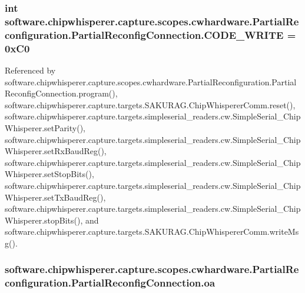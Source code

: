 \subsubsection[{C\+O\+D\+E\+\_\+\+W\+R\+I\+T\+E}]{\setlength{\rightskip}{0pt plus 5cm}int software.\+chipwhisperer.\+capture.\+scopes.\+cwhardware.\+Partial\+Reconfiguration.\+Partial\+Reconfig\+Connection.\+C\+O\+D\+E\+\_\+\+W\+R\+I\+T\+E = 0x\+C0\hspace{0.3cm}{\ttfamily [static]}}\label{classsoftware_1_1chipwhisperer_1_1capture_1_1scopes_1_1cwhardware_1_1PartialReconfiguration_1_1PartialReconfigConnection_a6bab5f476e2cc0a0237b6973bcb6713d}


Referenced by software.\+chipwhisperer.\+capture.\+scopes.\+cwhardware.\+Partial\+Reconfiguration.\+Partial\+Reconfig\+Connection.\+program(), software.\+chipwhisperer.\+capture.\+targets.\+S\+A\+K\+U\+R\+A\+G.\+Chip\+Whisperer\+Comm.\+reset(), software.\+chipwhisperer.\+capture.\+targets.\+simpleserial\+\_\+readers.\+cw.\+Simple\+Serial\+\_\+\+Chip\+Whisperer.\+set\+Parity(), software.\+chipwhisperer.\+capture.\+targets.\+simpleserial\+\_\+readers.\+cw.\+Simple\+Serial\+\_\+\+Chip\+Whisperer.\+set\+Rx\+Baud\+Reg(), software.\+chipwhisperer.\+capture.\+targets.\+simpleserial\+\_\+readers.\+cw.\+Simple\+Serial\+\_\+\+Chip\+Whisperer.\+set\+Stop\+Bits(), software.\+chipwhisperer.\+capture.\+targets.\+simpleserial\+\_\+readers.\+cw.\+Simple\+Serial\+\_\+\+Chip\+Whisperer.\+set\+Tx\+Baud\+Reg(), software.\+chipwhisperer.\+capture.\+targets.\+simpleserial\+\_\+readers.\+cw.\+Simple\+Serial\+\_\+\+Chip\+Whisperer.\+stop\+Bits(), and software.\+chipwhisperer.\+capture.\+targets.\+S\+A\+K\+U\+R\+A\+G.\+Chip\+Whisperer\+Comm.\+write\+Msg().

\hypertarget{classsoftware_1_1chipwhisperer_1_1capture_1_1scopes_1_1cwhardware_1_1PartialReconfiguration_1_1PartialReconfigConnection_a13cdf006aa85db7e688df730b1904b1b}{}
\subsubsection[{oa}]{\setlength{\rightskip}{0pt plus 5cm}software.\+chipwhisperer.\+capture.\+scopes.\+cwhardware.\+Partial\+Reconfiguration.\+Partial\+Reconfig\+Connection.\+oa}\label{classsoftware_1_1chipwhisperer_1_1capture_1_1scopes_1_1cwhardware_1_1PartialReconfiguration_1_1PartialReconfigConnection_a13cdf006aa85db7e688df730b1904b1b}


